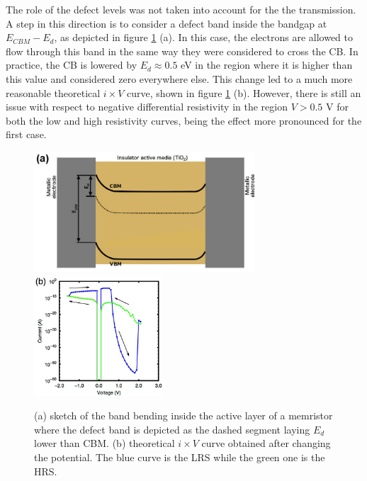 The role of the defect levels was not taken into account for the the transmission. A step in this direction is to consider a defect band inside the bandgap at $E_{CBM}-E_d$, as depicted in figure \ref{fig:ixvtheo-02} (a). In this case, the electrons are allowed to flow through this band in the same way they were considered to cross the CB. In practice, the CB is lowered by $E_d \approx 0.5$ eV in the region where it is higher than this value and considered zero everywhere else. This change led to a much more reasonable theoretical $i \times V$ curve, shown in figure \ref{fig:ixvtheo-02} (b). However, there is still an issue with respect to negative differential resistivity in the region $V > 0.5$ V for both the low and high resistivity curves, being the effect more pronounced for the first case. 
\begin{center}
  \begin{figure}[h!]
    \begin{center}
      \includegraphics[height=4.5cm]{img/defect-band.jpg} 
      \includegraphics[height=4.5cm]{img/ixv-deff.jpg} 
      \caption{(a) sketch of the band bending inside the active layer of a memristor where the defect band is depicted as the dashed segment laying $E_d$ lower than CBM. (b) theoretical $i \times V$ curve obtained after changing the potential. The blue curve is the LRS while the green one is the HRS.} 
      \label{fig:ixvtheo-02} 
    \end{center}
  \end{figure}
\end{center}

